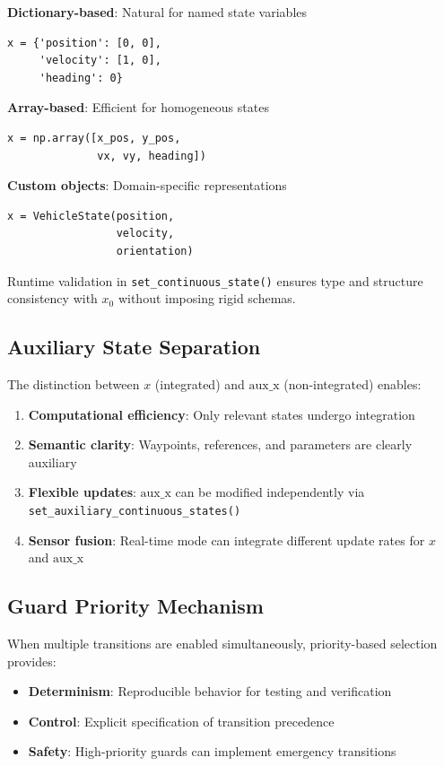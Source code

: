 \documentclass[conference]{IEEEtran}
\begin{document}
\textbf{Dictionary-based}: Natural for named state variables
\begin{lstlisting}
x = {'position': [0, 0], 
     'velocity': [1, 0], 
     'heading': 0}
\end{lstlisting}

\textbf{Array-based}: Efficient for homogeneous states
\begin{lstlisting}
x = np.array([x_pos, y_pos, 
              vx, vy, heading])
\end{lstlisting}

\textbf{Custom objects}: Domain-specific representations
\begin{lstlisting}
x = VehicleState(position, 
                 velocity, 
                 orientation)
\end{lstlisting}

Runtime validation in \texttt{set\_continuous\_state()} ensures type and structure consistency with $x_0$ without imposing rigid schemas.

\subsection{Auxiliary State Separation}

The distinction between $x$ (integrated) and $\text{aux\_x}$ (non-integrated) enables:

\begin{enumerate}
\item \textbf{Computational efficiency}: Only relevant states undergo integration
\item \textbf{Semantic clarity}: Waypoints, references, and parameters are clearly auxiliary
\item \textbf{Flexible updates}: $\text{aux\_x}$ can be modified independently via \texttt{set\_auxiliary\_continuous\_states()}
\item \textbf{Sensor fusion}: Real-time mode can integrate different update rates for $x$ and $\text{aux\_x}$
\end{enumerate}

\subsection{Guard Priority Mechanism}

When multiple transitions are enabled simultaneously, priority-based selection provides:

\begin{itemize}
\item \textbf{Determinism}: Reproducible behavior for testing and verification
\item \textbf{Control}: Explicit specification of transition precedence
\item \textbf{Safety}: High-priority guards can implement emergency transitions
\end{itemize}
\end{document}
